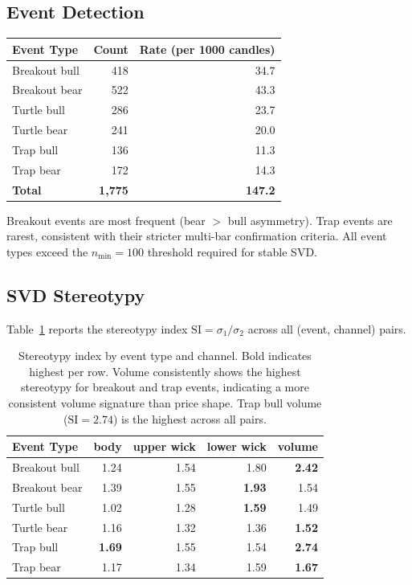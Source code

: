 \documentclass[11pt,a4paper]{article}
\theoremstyle{definition}
\theoremstyle{plain}
\begin{document}
\subsection{Event Detection}

\begin{center}
\begin{tabular}{lrr}
\hline
\textbf{Event Type} & \textbf{Count} & \textbf{Rate (per 1000 candles)} \\
\hline
Breakout bull  & 418 & 34.7 \\
Breakout bear  & 522 & 43.3 \\
Turtle bull    & 286 & 23.7 \\
Turtle bear    & 241 & 20.0 \\
Trap bull      & 136 & 11.3 \\
Trap bear      & 172 & 14.3 \\
\hline
\textbf{Total} & \textbf{1,775} & \textbf{147.2} \\
\hline
\end{tabular}
\end{center}

Breakout events are most frequent (bear $>$ bull asymmetry). Trap events
are rarest, consistent with their stricter multi-bar confirmation criteria.
All event types exceed the $n_{\min} = 100$ threshold required for stable
SVD.

\subsection{SVD Stereotypy}

Table~\ref{tab:stereotypy} reports the stereotypy index $\mathrm{SI} =
\sigma_1/\sigma_2$ across all (event, channel) pairs.

\begin{table}[ht]
\begin{center}
\begin{tabular}{lrrrr}
\hline
\textbf{Event Type} & \textbf{body} & \textbf{upper wick} & \textbf{lower wick} & \textbf{volume} \\
\hline
Breakout bull  & 1.24 & 1.54 & 1.80 & \textbf{2.42} \\
Breakout bear  & 1.39 & 1.55 & \textbf{1.93} & 1.54 \\
Turtle bull    & 1.02 & 1.28 & \textbf{1.59} & 1.49 \\
Turtle bear    & 1.16 & 1.32 & 1.36 & \textbf{1.52} \\
Trap bull      & \textbf{1.69} & 1.55 & 1.54 & \textbf{2.74} \\
Trap bear      & 1.17 & 1.34 & 1.59 & \textbf{1.67} \\
\hline
\end{tabular}
\end{center}
\caption{Stereotypy index by event type and channel. Bold indicates highest
per row. Volume consistently shows the highest stereotypy for breakout and
trap events, indicating a more consistent volume signature than price shape.
Trap bull volume ($\mathrm{SI} = 2.74$) is the highest across all pairs.}
\label{tab:stereotypy}
\end{table}
\end{document}
